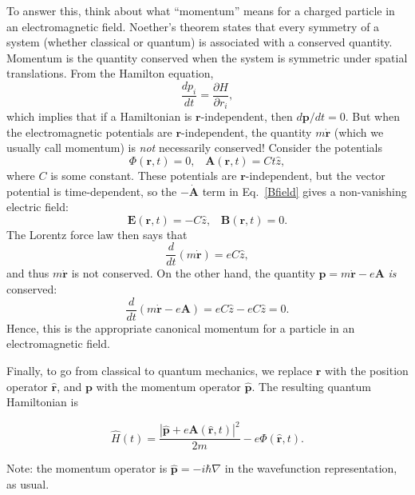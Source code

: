 \documentclass[pra,12pt]{revtex4}
\begin{document}
To answer this, think about what ``momentum'' means for a charged
particle in an electromagnetic field.  Noether's theorem states that
every symmetry of a system (whether classical or quantum) is
associated with a conserved quantity.  Momentum is the quantity
conserved when the system is symmetric under spatial translations.
From the Hamilton equation,
\begin{equation*}
  \frac{dp_i}{dt} = \frac{\partial H}{\partial r_i},
\end{equation*}
which implies that if a Hamiltonian is $\mathbf{r}$-independent, then
$d\mathbf{p}/dt = 0$.  But when the electromagnetic potentials are
$\mathbf{r}$-independent, the quantity $m\dot{\mathbf{r}}$ (which we
usually call momentum) is \textit{not} necessarily conserved!
Consider the potentials
\begin{equation}
  \Phi(\mathbf{r}, t) = 0, \;\;\; \mathbf{A}(\mathbf{r}, t) = Ct \hat{z},
\end{equation}
where $C$ is some constant.  These potentials are
$\mathbf{r}$-independent, but the vector potential is time-dependent,
so the $-\dot{\mathbf{A}}$ term in Eq.~\eqref{Bfield} gives a
non-vanishing electric field:
\begin{equation}
  \mathbf{E}(\mathbf{r},t) = - C\hat{z}, \;\;\;\mathbf{B}(\mathbf{r},t) = 0.
\end{equation}
The Lorentz force law then says that
\begin{equation}
  \frac{d}{dt}(m\dot{\mathbf{r}}) = eC\hat{z},
\end{equation}
and thus $m\dot{\mathbf{r}}$ is not conserved.  On the other hand, the
quantity $\mathbf{p} = m\dot{\mathbf{r}} - e \mathbf{A}$ \textit{is}
conserved:
\begin{equation}
  \frac{d}{dt}(m\dot{\mathbf{r}} - e\mathbf{A}) =
  eC\hat{z} - eC\hat{z} = 0.
\end{equation}
Hence, this is the appropriate canonical momentum for a particle in an
electromagnetic field.

Finally, to go from classical to quantum mechanics, we replace
$\mathbf{r}$ with the position operator $\hat{\mathbf{r}}$, and
$\mathbf{p}$ with the momentum operator $\hat{\mathbf{p}}$.  The
resulting quantum Hamiltonian is
\begin{framed}
  \begin{equation}
    \hat{H}(t) = \frac{|\hat{\mathbf{p}}+e\mathbf{A}(\hat{\mathbf{r}},t)|^2}{2m}
    - e\Phi(\hat{\mathbf{r}},t).
    \label{quantumH}
  \end{equation}
\end{framed}
\vskip -0.15in
\noindent
Note: the momentum operator is $\hat{\mathbf{p}} = -i\hbar\nabla$
in the wavefunction representation, as usual.
\end{document}
